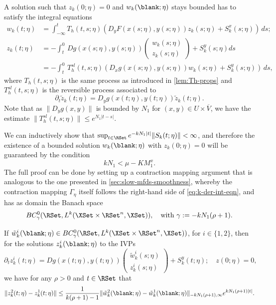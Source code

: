 \documentclass[a4paper]{siamart190516}
\begin{document}
A solution such that $z_k(0;\eta) = 0$ and $w_k(\blank; \eta)$ stays bounded has to satisfy the integral equations
\begin{equation}\label{eq:k-der-int-eqn}
\begin{aligned}
w_k(t; \eta) &= \int^t_{-\infty} T_h(t,s; \eta) \left( D_yF(x(s;\eta),y(s;\eta)) z_k(s; \eta) + S^x_{k}(s; \eta) \right) \, ds  ; \\
z_k(t; \eta) &= - \int^0_t \, Dg(x(s;\eta), y(s;\eta)) \begin{pmatrix} w_k(s; \eta) \\ z_k(s; \eta)  \end{pmatrix}  + S^y_k(s; \eta) ds \\
&= - \int^0_t \,T^{sl}_h(t,s; \eta) \left( D_x g(x(s;\eta), y(s;\eta))  w_k(s; \eta) + S^y_k(s; \eta) \right) \, ds,
\end{aligned}
\end{equation}
where $T_h(t,s; \eta)$ is the same process as introduced in \cref{lem:Th-props} and $T^{sl}_h(t,s; \eta)$ is the reversible process associated to
\[
\partial_t \tilde{z}_k(t; \eta) =  D_y g(x(t;\eta), y(t;\eta)) \tilde{z}_k(t; \eta).
\]
Note that as $\| D_y g(x,y) \|$ is bounded by $N_1$ for $(x,y) \in U \times \overline{V}$, we have the estimate $\| T^{sl}_h(t,s; \eta) \| \leq e^{N_1|t-s|}$. 

We can inductively show that $\sup_{t \in \RSet} e^{-k N_1|t|} \| S_k(t; \eta) \| < \infty$, and therefore the existence of a bounded solution $w_k(\blank; \eta)$ with $z_k(0;\eta)=0$ will be guaranteed by the condition 
\[
kN_1 < \mu - KM^x_1.
\]
The full proof can be done by setting up a contraction mapping argument that is
analogous to the one presented in \cref{sec:slow-mfds-smoothness}, whereby the
contraction mapping $\Gamma_{\eta}$ itself follows the right-hand side of \cref{eq:k-der-int-eqn}, and has as domain the Banach space
\[
BC^0_{\gamma}(\RSet, L^k(\XSet \times \RSet^n, \XSet)), \quad \text{with } \gamma := -k N_1 (\rho+1).
\]

If $\tilde{w}^i_k(\blank; \eta) \in BC^0_{\gamma}(\RSet, L^k(\XSet \times \RSet^n, \XSet))$, for $i \in \{1,2\}$, then for the solutions $z^i_k(\blank; \eta)$ to the IVPs
 \[
 \partial_t z^i_k(t; \eta) = D g(x(t;\eta), y(t;\eta)) \begin{pmatrix} \tilde{w}^i_k(s; \eta) \\ z^i_k(s; \eta)  \end{pmatrix}   + S^y_{k}(t; \eta); \quad z(0; \eta) = 0,
 \]
we have for any $\rho > 0$ and $t \in \RSet$ that
\[
\| z_k^2(t; \eta) - z_k^1(t; \eta) \| \leq \frac{1}{k(\rho+1)-1} \| \tilde{w}_k^2(\blank; \eta) - \tilde{w}_k^1(\blank; \eta)\|_{-k N_1 (\rho+1),\infty} e^{k N_1 (\rho+1)|t|}.
\]
\end{document}
